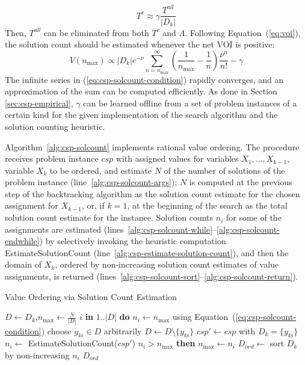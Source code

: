 \begin{equation}
\label{eq:csp-gamma}
T^c \approx \gamma \frac {T^{all}} {|D_k|}
\end{equation}
Then, $T^{all}$ can be eliminated from both $T^c$ and $\Lambda$. 
Following Equation~(\ref{eq:voi}), the solution count 
should be estimated whenever the net VOI is positive:
\begin{equation}
\label{eq:csp-solcount-condition}
V(n_\mathrm{max}) \propto |D_k|e^{-\nu}\sum_{n=n_\mathrm{max}}^\infty \! \! \left( \frac 1 {n_\mathrm{max}} - \frac 1 n\right) \frac {\nu^n} {n!}-\gamma
\end{equation}
The infinite series in
(\ref{eq:csp-solcount-condition}) rapidly converges, and an
approximation of the sum can be computed efficiently. As done
in Section \ref{sec:csp-empirical}, $\gamma$ can be learned
offline from a set of problem instances of a certain kind for the
given implementation of the search algorithm and the solution counting
heuristic.

Algorithm~\ref{alg:csp-solcount} implements rational value ordering.
The procedure receives problem instance $csp$ with assigned values for
variables $X_1, ..., X_{k-1}$, variable $X_k$ to be ordered, and
estimate $N$ of the number of solutions of the problem instance
(line~\ref{alg:csp-solcount-args}); $N$ is computed at the previous
step of the backtracking algorithm as the solution count estimate for
the chosen assignment for $X_{k-1}$, or, if $k=1$, at the beginning of
the search as the total solution count estimate for the
instance. Solution counts $n_i$ for some of the assignments are
estimated (lines~\ref{alg:csp-solcount-while}--\ref{alg:csp-solcount-endwhile})
by selectively invoking the heuristic computation {\sc
  EstimateSolutionCount} (line~\ref{alg:csp-estimate-solution-count}),
and then the domain of $X_k$, ordered by non-increasing solution count
estimates of value assignments, is returned
(lines~\ref{alg:csp-solcount-sort}--\ref{alg:csp-solcount-return}).

\begin{algorithm}[h]
\caption{Value Ordering via Solution Count Estimation}
\label{alg:csp-solcount}
\begin{algorithmic}[1]
\label{alg:csp-solcount-args}
  \State $D \gets D_k$,\hspace{1em}$n_\mathrm{max} \gets \frac N {|D|}$
   {$i$ {\bf in} $1..|D|$} {\bf do} $n_i \gets n_\mathrm{max}$
   \label{alg:csp-solcount-while} \Comment using Equation~(\ref{eq:csp-solcount-condition})
    \State choose $y_{ki} \in D$ arbitrarily
    \State $D \gets D \setminus \{y_{ki}\}$
    \State $csp' \gets csp$ with $D_k=\{y_{ki}\}$
    \State $n_i \gets$ {\sc EstimateSolutionCount}($csp'$) \label{alg:csp-estimate-solution-count}
     {$n_i>n_\mathrm{max}$} {\bf then} $n_\mathrm{max} \gets n_i$
  \EndWhile \label{alg:csp-solcount-endwhile}
  \State $D_{ord} \gets$ sort $D_k$ by non-increasing $n_i$ \label{alg:csp-solcount-sort}
   $D_{ord}$ \label{alg:csp-solcount-return}
\EndProcedure
\end{algorithmic}
\end{algorithm}

